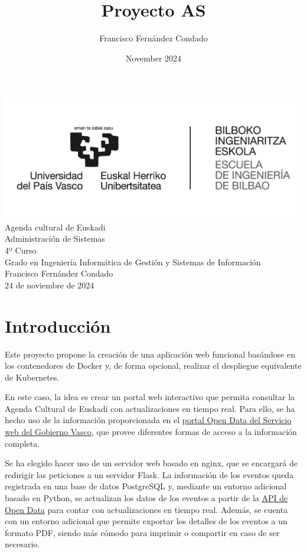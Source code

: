 \documentclass{report}
\title{Proyecto AS}
\author{Francisco Fernández Condado}
\date{November 2024}
\begin{document}
    \begin{titlepage}
        \centering
        \includegraphics[width=0.7\linewidth]{img/bie.jpg}\\
        \vspace{3.5cm}
        \Huge Agenda cultural de Euskadi\\
        \vspace{2.5cm}
        \Large Administración de Sistemas\\
        \vspace{0.5cm}
        \large 4º Curso\\
        \vspace{3cm}
        \LARGE Grado en Ingeniería Informática de Gestión y Sistemas de Información\\
        \vspace{1cm}
        \large Francisco Fernández Condado\\
        \vspace{0.5cm}
        \large 24 de noviembre de 2024\\
    \end{titlepage}
    
    \tableofcontents
    \listoffigures
    \listoftables
    
    \chapter{Introducción}
        Este proyecto propone la creación de una aplicación web funcional basándose en los contenedores de Docker y, de forma opcional, realizar el despliegue equivalente de Kubernetes.

        En este caso, la idea es crear un portal web interactivo que permita consultar la Agenda Cultural de Euskadi con actualizaciones en tiempo real. Para ello, se ha hecho uso de la información proporcionada en el \href{https://opendata.euskadi.eus/catalogo/-/kulturklik-agenda-cultural/}{portal Open Data del Servicio web del Gobierno Vasco}, que provee diferentes formas de acceso a la información completa.

        Se ha elegido hacer uso de un servidor web basado en nginx, que se encargará de redirigir las peticiones a un servidor Flask. La información de los eventos queda registrada en una base de datos PostgreSQL y, mediante un entorno adicional basado en Python, se actualizan los datos de los eventos a partir de la \href{https://opendata.euskadi.eus/apis/-/apis-open-data/}{API de Open Data} para contar con actualizaciones en tiempo real. Además, se cuenta con un entorno adicional que permite exportar los detalles de los eventos a un formato PDF, siendo más cómodo para imprimir o compartir en caso de ser necesario.
\end{document}
